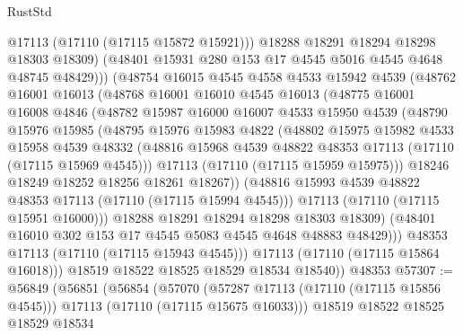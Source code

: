 \begin{lexlean}{RustStd}
\begin{coremodule}
                  @17113
                  (@17110 (@17115 @15872 @15921)))
                @18288
                @18291
                @18294
                @18298
                @18303
                @18309)
              (@48401 @15931 @280 @153 @17 @4545 @5016 @4545 @4648 @48745 @48429)))
          (@48754
            @16015
            @4545
            @4558
            @4533
            @15942
            @4539
            (@48762
              @16001
              @16013
              (@48768
                @16001
                @16010
                @4545
                @16013
                (@48775
                  @16001
                  @16008
                  @4846
                  (@48782
                    @15987
                    @16000
                    @16007
                    @4533
                    @15950
                    @4539
                    (@48790
                      @15976
                      @15985
                      (@48795
                        @15976
                        @15983
                        @4822
                        (@48802
                          @15975
                          @15982
                          @4533
                          @15958
                          @4539
                          @48332
                          (@48816 @15968 @4539 @48822 @48353 @17113 (@17110 (@17115 @15969 @4545)))
                          @17113
                          (@17110 (@17115 @15959 @15975)))
                        @18246
                        @18249
                        @18252
                        @18256
                        @18261
                        @18267))
                    (@48816 @15993 @4539 @48822 @48353 @17113 (@17110 (@17115 @15994 @4545)))
                    @17113
                    (@17110 (@17115 @15951 @16000)))
                  @18288
                  @18291
                  @18294
                  @18298
                  @18303
                  @18309)
                (@48401 @16010 @302 @153 @17 @4545 @5083 @4545 @4648 @48883 @48429)))
            @48353
            @17113
            (@17110 (@17115 @15943 @4545)))
          @17113
          (@17110 (@17115 @15864 @16018)))
        @18519
        @18522
        @18525
        @18529
        @18534
        @18540))
    @48353
@57307 := @56849
    (@56851
      (@56854
        (@57070
          (@57287 @17113 (@17110 (@17115 @15856 @4545)))
          @17113
          (@17110 (@17115 @15675 @16033)))
        @18519
        @18522
        @18525
        @18529
        @18534

\end{coremodule}
\end{lexlean}
